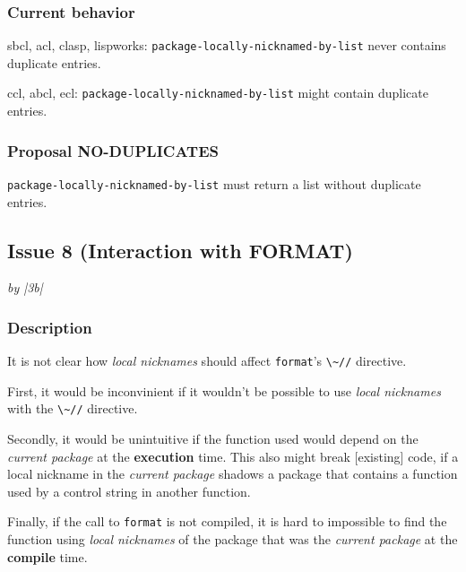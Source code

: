 \documentclass[11pt]{article}
\begin{document}
\subsubsection{Current behavior}
\label{sec:org71d44ce}
sbcl, acl, clasp, lispworks:
  \texttt{package-locally-nicknamed-by-list} never contains duplicate entries.

ccl, abcl, ecl:
  \texttt{package-locally-nicknamed-by-list} might contain duplicate entries.
\subsubsection{Proposal NO-DUPLICATES}
\label{sec:org33fb4f8}
\texttt{package-locally-nicknamed-by-list} must return a list without duplicate entries.

\subsection{Issue 8 (Interaction with FORMAT)}
\label{sec:orgf59d09e}
\emph{by |3b|}
\subsubsection{Description}
\label{sec:org652fe55}
It is not clear how \emph{local nicknames} should affect \texttt{format}'s \texttt{\textbackslash{}\textasciitilde{}//} directive.

First, it would be inconvinient if it wouldn't be possible to use \emph{local
nicknames} with the \texttt{\textbackslash{}\textasciitilde{}//} directive.

Secondly, it would be unintuitive if the function used would depend on the
\emph{current package} at the \textbf{execution} time. This also might break [existing] code,
if a local nickname in the \emph{current package} shadows a package that contains a
function used by a control string in another function.

Finally, if the call to \texttt{format} is not compiled, it is hard to impossible to find
the function using \emph{local nicknames} of the package that was the \emph{current package}
at the \textbf{compile} time.
\end{document}
